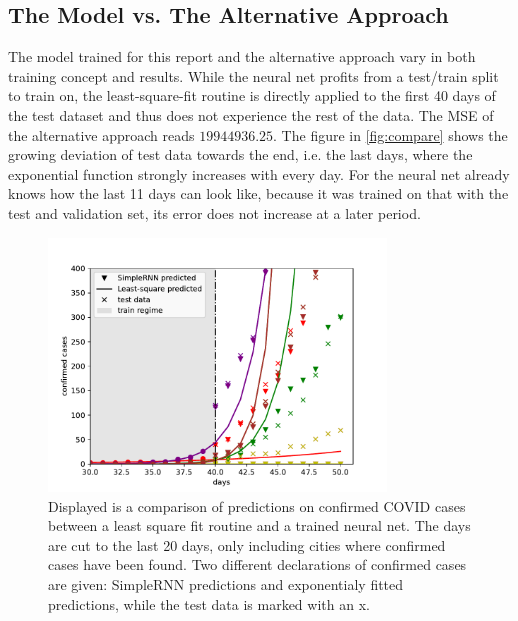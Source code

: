 \subsection{The Model vs. The Alternative Approach}
The model trained for this report and the alternative approach vary in both training concept and results. While the neural net profits from a test/train split to train on, the least-square-fit routine is directly applied to the first 40 days of the test dataset and thus does not experience the rest of the data.
The MSE of the alternative approach reads $19944936.25$. The figure in \ref{fig:compare} shows the growing deviation of test data towards the end, i.e. the last days, where the exponential function strongly increases with every day. For the neural net already knows how the last 11 days can look like, because it was trained on that with the test and validation set, its error does not increase at a later period.



\begin{figure}[H]                          
    \centering
    \includegraphics[width = 0.8\textwidth]{images/alternative.pdf}
    \caption{Displayed is a comparison of predictions on confirmed COVID cases between a least square fit routine and a trained neural net. The days are cut to the last 20 days, only including cities where confirmed cases have been found. 
    Two different declarations of confirmed cases are given: SimpleRNN predictions and exponentialy fitted predictions, while the test data is marked with an x. }
    \label{fig:alternative}
\end{figure}


